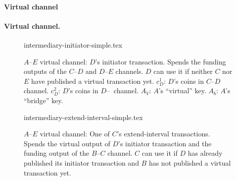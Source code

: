   \makeatletter%
    {\paragraph{Virtual channel}}%
    {\paragraph{Virtual channel.}}%
  \makeatother%
%
  \begin{figure}[!htbp]
%
    {intermediary-initiator-simple.tex}
    \caption{$A$--$E$ virtual channel: $D$'s initiator transaction. Spends the
    funding outputs of the $C$--$D$ and $D$--$E$ channels. $D$ can use it if neither
    $C$ nor $E$ have published a virtual transaction yet. $c_D^1$: $D$'s coins
    in $C$--$D$ channel. $c_D^2$: $D$'s coins in $D$--$~$ channel. $A_V$: $A$'s
    ``virtual'' key. $A_b$: $A$'s ``bridge'' key.}
    \label{figure:virtual-layer-initiator-simple}
  \end{figure}
%
%
  \begin{figure}[!htbp]
%
    {intermediary-extend-interval-simple.tex}
    \caption{$A$--$E$ virtual channel: One of $C$'s extend-interval
    transactions. Spends the virtual output of $D$'s
    initiator transaction and the funding output of the $B$--$C$ channel. $C$ can
    use it if $D$ has already published its initiator transaction and $B$ has
    not published a virtual transaction yet.}
    \label{figure:virtual-layer-extend-interval-simple}
  \end{figure}
%

